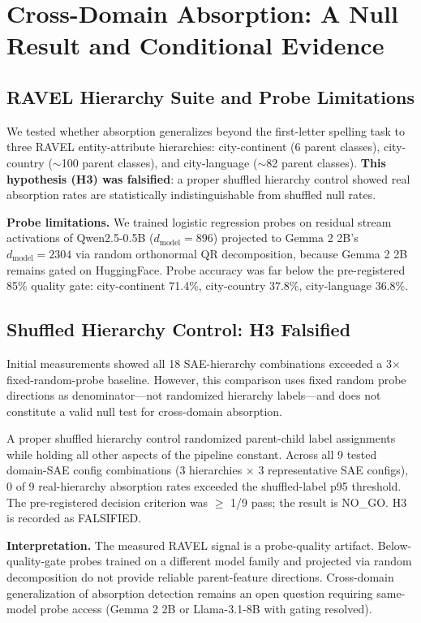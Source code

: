 \documentclass{article}
\begin{document}
\section{Cross-Domain Absorption: A Null Result and Conditional Evidence}

\subsection{RAVEL Hierarchy Suite and Probe Limitations}

We tested whether absorption generalizes beyond the first-letter spelling task to three RAVEL entity-attribute hierarchies: city-continent (6 parent classes), city-country ($\sim$100 parent classes), and city-language ($\sim$82 parent classes). \textbf{This hypothesis (H3) was falsified}: a proper shuffled hierarchy control showed real absorption rates are statistically indistinguishable from shuffled null rates.

\textbf{Probe limitations.} We trained logistic regression probes on residual stream activations of Qwen2.5-0.5B ($d_{\text{model}} = 896$) projected to Gemma 2 2B's $d_{\text{model}} = 2304$ via random orthonormal QR decomposition, because Gemma 2 2B remains gated on HuggingFace. Probe accuracy was far below the pre-registered 85\% quality gate: city-continent 71.4\%, city-country 37.8\%, city-language 36.8\%.

\subsection{Shuffled Hierarchy Control: H3 Falsified}

Initial measurements showed all 18 SAE-hierarchy combinations exceeded a 3$\times$ fixed-random-probe baseline. However, this comparison uses fixed random probe directions as denominator---not randomized hierarchy labels---and does not constitute a valid null test for cross-domain absorption.

A proper shuffled hierarchy control randomized parent-child label assignments while holding all other aspects of the pipeline constant. Across all 9 tested domain-SAE config combinations (3 hierarchies $\times$ 3 representative SAE configs), 0 of 9 real-hierarchy absorption rates exceeded the shuffled-label p95 threshold. The pre-registered decision criterion was $\geq$ 1/9 pass; the result is NO\_GO. H3 is recorded as FALSIFIED.

\textbf{Interpretation.} The measured RAVEL signal is a probe-quality artifact. Below-quality-gate probes trained on a different model family and projected via random decomposition do not provide reliable parent-feature directions. Cross-domain generalization of absorption detection remains an open question requiring same-model probe access (Gemma 2 2B or Llama-3.1-8B with gating resolved).
\end{document}
